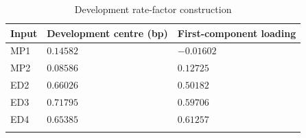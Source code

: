 \begin{table}[htbp]
\centering
{\fontsize{10}{12}\selectfont\renewcommand{\arraystretch}{1.22}\setlength{\tabcolsep}{4pt}
\begin{tabularx}{\linewidth}{@{}L{33mm}C{60mm}X@{}}
\toprule{}
\textbf{Input} & \textbf{Development centre (bp)} & \textbf{First-component loading} \\ \midrule
MP1 & $0.14582$ & $-0.01602$ \\ \hline
MP2 & $0.08586$ & $0.12725$ \\ \hline
ED2 & $0.66026$ & $0.50182$ \\ \hline
ED3 & $0.71795$ & $0.59706$ \\ \hline
ED4 & $0.65385$ & $0.61257$ \\ \hline
{}\bottomrule\end{tabularx}}
\caption[Development rate-factor construction]{Development rate-factor construction}\label{tab:pca}
\end{table}

